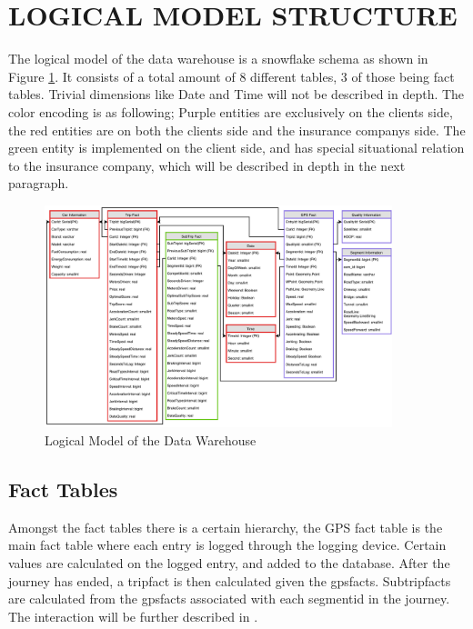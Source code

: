 \section{LOGICAL MODEL STRUCTURE}\label{sec:dataware}

The logical model of the data warehouse is a snowflake schema as shown in Figure \ref{fig:datawarehouse}. It consists of a total amount of 8 different tables, 3 of those being fact tables. Trivial dimensions like Date and Time will not be described in depth. The color encoding is as following; Purple entities are exclusively on the clients side, the red entities are on both the clients side and the insurance companys side. The green entity is implemented on the client side, and has special situational relation to the insurance company, which will be described in depth in the next paragraph.

\begin{figure}[tb]
\centering
\includegraphics[width=0.9\textwidth]{Pictures/ERDiagram}
\caption{Logical Model of the Data Warehouse}
\label{fig:datawarehouse}
\end{figure}

\subsection{Fact Tables}

Amongst the fact tables there is a certain hierarchy, the GPS fact table is the main fact table where each entry is logged through the logging device. Certain values are calculated on the logged entry, and added to the database. After the journey has ended, a tripfact is then calculated given the gpsfacts. Subtripfacts are calculated from the gpsfacts associated with each segmentid in the journey. The interaction will be further described in .

